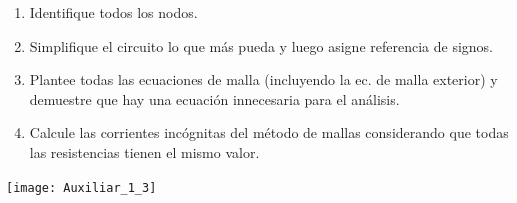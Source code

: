 \documentclass[
  11pt,
  letterpaper,
   addpoints,
   answers
  ]{exam}
\begin{document}
\begin{questions}
\begin{solution}

\end{solution}
\question \begin{enumerate}
    \item Identifique todos los nodos.
    \item Simplifique el circuito lo que más pueda y luego asigne referencia de signos.
    \item Plantee todas las ecuaciones de malla (incluyendo la ec. de malla exterior) y demuestre que hay una ecuación innecesaria para el análisis.
    \item Calcule las corrientes incógnitas del método de mallas considerando que todas las resistencias tienen el mismo valor.
\end{enumerate}
\begin{center}
    \texttt{[image: Auxiliar\_1\_3]}
\end{center}
\end{questions}
\newpage
\end{document}

